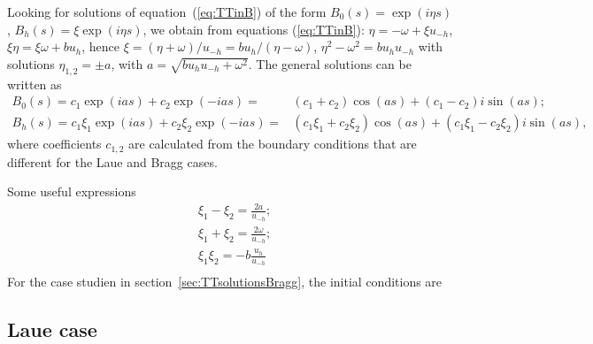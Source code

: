 \documentclass[preprint]{iucr}              %
\begin{document}
Looking for solutions of equation~(\ref{eq:TTinB}) of the form $B_0(s)=\exp(i \eta s)$, $B_h(s)=\xi \exp(i \eta s)$, we obtain from equations (\ref{eq:TTinB}): $\eta =-\omega + \xi u_{-h}$, $\xi \eta=\xi \omega+b u_h$,
hence $\xi=(\eta+\omega)/u_{-h}=b u_h / (\eta-\omega)$, $\eta^2-\omega^2=b u_h u_{-h}$ with solutions $\eta_{1,2}=\pm a$, with $\boxed{a=\sqrt{b u_h u_{-h}+\omega^2}}$.
The general solutions can be written as 
\begin{subequations}
\label{eq:BSolutions}
\begin{align}
B_0(s) = c_1 \exp(i a s) + c_2 \exp(-i a s) =& (c_1+c_2) \cos(as) + (c_1-c_2) i \sin(as); \\
B_h(s) = c_1 \xi_1 \exp(i a s) + c_2 \xi_2 \exp(-i a s) =& (c_1 \xi_1+c_2 \xi_2) \cos(as) + (c_1 \xi_1-c_2 \xi_2) i \sin(as),
\end{align}
\end{subequations}
where coefficients $c_{1,2}$ are calculated from the boundary conditions that are different for the Laue and Bragg cases.

Some useful expressions
\begin{subequations}
\label{eq:TTuseful}
\begin{align}
&\xi_1-\xi_2 = \frac{2 a}{u_{-h}};\\
&\xi_1+\xi_2 = \frac{2 \omega}{u_{-h}};\\
&\xi_1 \xi_2 = -b \frac{u_h}{u_{-h}}\\
\end{align}
\end{subequations}
For the case studien in section~\ref{sec:TTsolutionsBragg}, the initial conditions are 
%
\subsection{Laue case}
\label{sec:TTsolutionsLaue}
\end{document}
